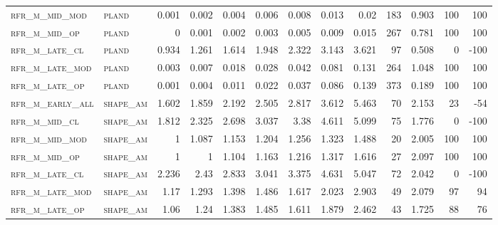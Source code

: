 \begin{landscape}
\begin{center}
\begin{footnotesize}
\begin{longtable}{llrrrrrrrr|rrr}
\textsc{rfr\_m\_mid\_mod  } & \textsc{pland     }   & 0.001   & 0.002   & 0.004   & 0.006    & 0.008    & 0.013    & 0.02     & 183    & 0.903         & 100           & 100             \\
\textsc{rfr\_m\_mid\_op   } & \textsc{pland     }   & 0       & 0.001   & 0.002   & 0.003    & 0.005    & 0.009    & 0.015    & 267    & 0.781         & 100           & 100             \\
\textsc{rfr\_m\_late\_cl  } & \textsc{pland     }   & 0.934   & 1.261   & 1.614   & 1.948    & 2.322    & 3.143    & 3.621    & 97     & 0.508         & 0             & -100            \\
\textsc{rfr\_m\_late\_mod } & \textsc{pland     }   & 0.003   & 0.007   & 0.018   & 0.028    & 0.042    & 0.081    & 0.131    & 264    & 1.048         & 100           & 100             \\
\textsc{rfr\_m\_late\_op  } & \textsc{pland     }   & 0.001   & 0.004   & 0.011   & 0.022    & 0.037    & 0.086    & 0.139    & 373    & 0.189         & 100           & 100             \\
\textsc{rfr\_m\_early\_all} & \textsc{shape\_am }   & 1.602   & 1.859   & 2.192   & 2.505    & 2.817    & 3.612    & 5.463    & 70     & 2.153         & 23            & -54             \\
\textsc{rfr\_m\_mid\_cl   } & \textsc{shape\_am }   & 1.812   & 2.325   & 2.698   & 3.037    & 3.38     & 4.611    & 5.099    & 75     & 1.776         & 0             & -100            \\
\textsc{rfr\_m\_mid\_mod  } & \textsc{shape\_am }   & 1       & 1.087   & 1.153   & 1.204    & 1.256    & 1.323    & 1.488    & 20     & 2.005         & 100           & 100             \\
\textsc{rfr\_m\_mid\_op   } & \textsc{shape\_am }   & 1       & 1       & 1.104   & 1.163    & 1.216    & 1.317    & 1.616    & 27     & 2.097         & 100           & 100             \\
\textsc{rfr\_m\_late\_cl  } & \textsc{shape\_am }   & 2.236   & 2.43    & 2.833   & 3.041    & 3.375    & 4.631    & 5.047    & 72     & 2.042         & 0             & -100            \\
\textsc{rfr\_m\_late\_mod } & \textsc{shape\_am }   & 1.17    & 1.293   & 1.398   & 1.486    & 1.617    & 2.023    & 2.903    & 49     & 2.079         & 97            & 94              \\
\textsc{rfr\_m\_late\_op  } & \textsc{shape\_am }   & 1.06    & 1.24    & 1.383   & 1.485    & 1.611    & 1.879    & 2.462    & 43     & 1.725         & 88            & 76              \\

\end{longtable}
\end{footnotesize}
\end{center}
\end{landscape}
